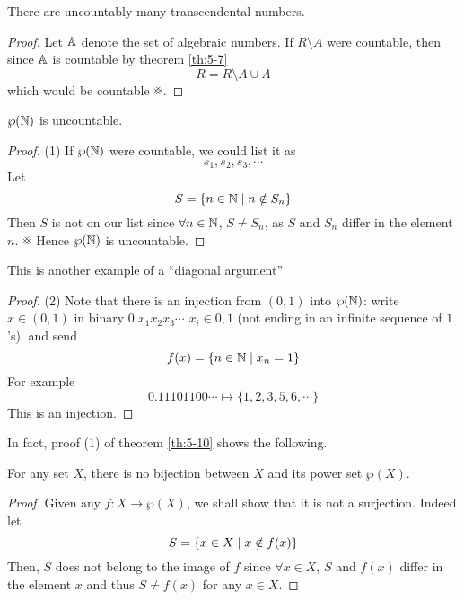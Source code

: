 \documentclass{article}
\begin{document}
\begin{ncor}\label{cor:5-9}
    There are uncountably many transcendental numbers.
\end{ncor}
\begin{proof}
    Let $\mathbb{A}$ denote the set of algebraic numbers.
    If $R \setminus A$ were countable, then since $\mathbb{A}$ is countable by theorem \ref{th:5-7}
    \[
        R = R \setminus A \cup A  
    \]
    which would be countable $\contradiction$.
\end{proof}

\begin{nthm}\label{th:5-10}
    $\wp(\mathbb{N})$ is uncountable.
\end{nthm}
\begin{proof} (1)
    If $\wp(\mathbb{N})$ were countable, we could list it as
    \[
        s_1, s_2, s_3, \cdots  
    \]
    Let 
    \[
        S = \{n \in \mathbb{N} \mid n \notin S_n\}  
    \]
    Then $S$ is not on our list since $\forall n \in \mathbb{N}$, $S \neq S_n$, as $S$ and $S_n$ differ in the element $n$. $\contradiction$
    Hence $\wp(\mathbb{N})$ is uncountable.
\end{proof}
\begin{remark}
    This is another example of a ``diagonal argument''
\end{remark}
\begin{proof} (2)
    Note that there is an injection from $(0, 1)$ into $\wp(\mathbb{N})$:
    write $x \in (0, 1)$ in binary $0.x_1x_2x_3\cdots$ $x_i \in {0, 1}$ (not ending in an infinite sequence of $1$'s).
    and send
    \[
        f(x) = \left\{ n \in \mathbb{N} \mid x_n = 1 \right\}  
    \]
    For example
    \[
        0.11101100 \cdots \mapsto \{1, 2, 3, 5, 6, \cdots\}
    \]
    This is an injection.
\end{proof}

In fact, proof (1) of theorem \ref{th:5-10} shows the following.

\begin{nthm}\label{th:5-11}
    For any set $X$, there is no bijection between $X$ and its power set $\wp(X)$.
\end{nthm}
\begin{proof}
    Given any $f: X \rightarrow \wp(X)$, we shall show that it is not a surjection.
    Indeed let 
    \[
        S = \left\{ x \in X \mid x \notin f(x) \right\}  
    \]
    Then, $S$ does not belong to the image of $f$ since $\forall x \in X$, $S$ and $f(x)$ differ in the element $x$ and thus $S \neq f(x)$ for any $x \in X$.
\end{proof}
\end{document}

